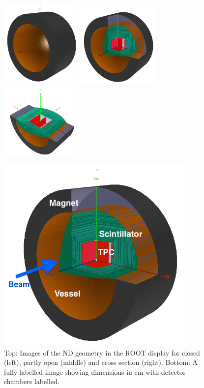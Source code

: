\begin{figure}[hbtp]
\begin{center}
  \includegraphics[width=40mm]{Chapter4/figures/nd_closed.png}
  \includegraphics[width=40mm]{Chapter4/figures/nd_partially_open.png} 
  \includegraphics[width=40mm]{Chapter4/figures/nd_open.png}
\end{center}
\begin{center}
  \includegraphics[width=100mm]{Chapter4/figures/nd_labelled.png}
  \caption{Top: Images of the ND geometry in the ROOT display for closed (left), partly open (middle) and cross section (right). Bottom: A fully labelled image showing dimensions in cm with detector chambers labelled.}
  \label{fig:ndGeometry}
\end{center}
\end{figure}

